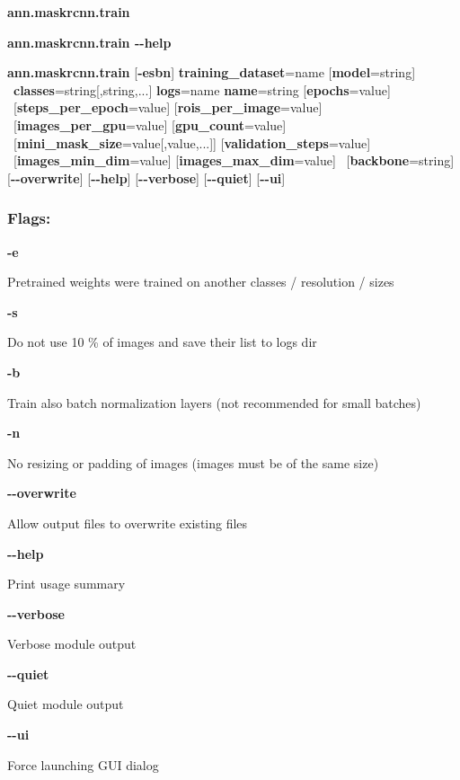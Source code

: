\begin{flushleft}
\textbf{ann.maskrcnn.train} 

\textbf{ann.maskrcnn.train -{}-help}

\textbf{ann.maskrcnn.train} [\textbf{-esbn}] \textbf{training\_dataset}=name [\textbf{model}=string] \tab\ \textbf{classes}=string[,string,...] \textbf{logs}=name \textbf{name}=string [\textbf{epochs}=value] \tab\ [\textbf{steps\_per\_epoch}=value] [\textbf{rois\_per\_image}=value] \tab\ [\textbf{images\_per\_gpu}=value] [\textbf{gpu\_count}=value] \tab\ [\textbf{mini\_mask\_size}=value[,value,...]] [\textbf{validation\_steps}=value] \tab\ [\textbf{images\_min\_dim}=value] [\textbf{images\_max\_dim}=value] \tab\ [\textbf{backbone}=string] [\textbf{-{}-overwrite}] [\textbf{-{}-help}] [\textbf{-{}-verbose}] [\textbf{-{}-quiet}] [\textbf{-{}-ui}]
\end{flushleft}

\subsubsection*{Flags:}
\begin{flushleft}
  \textbf{-e}
  
  \tab Pretrained weights were trained on another classes / resolution / sizes
  
  \textbf{-s}
  
  \tab Do not use 10 \% of images and save their list to logs dir
  
  \textbf{-b}
  
  \tab Train also batch normalization layers (not recommended for small batches)

  \textbf{-n}
  
  \tab No resizing or padding of images (images must be of the same size)
  
  \textbf{-{}-overwrite}
  
  \tab Allow output files to overwrite existing files
  
  \textbf{-{}-help}
  
  \tab Print usage summary
  
  \textbf{-{}-verbose}
  
  \tab Verbose module output
  
  \textbf{-{}-quiet}
  
  \tab Quiet module output
  
  \textbf{-{}-ui}
  
  \tab Force launching GUI dialog
\end{flushleft}


